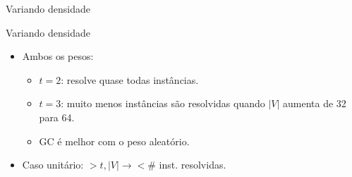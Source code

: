 \documentclass[dvipsnames]{beamer}
\begin{document}
\begin{frame}{Variando densidade}
\begin{figure}%
    \centering
    \label{fig:time_inst_den-sf2_sf3-euclidean}%
\end{figure}
\end{frame}

\begin{frame}{Variando densidade}
\begin{itemize}
\item Ambos os pesos:
  \begin{itemize}
  \item $t = 2$: resolve quase todas instâncias.
  \item $t = 3$: muito menos instâncias são resolvidas quando $|V|$ aumenta de 32 para 64.
  \item GC é melhor com o peso aleatório.
  \end{itemize}
  \item Caso unitário: $> t, |V| \rightarrow < \#$ inst. resolvidas.
\end{itemize}  
  \end{frame}
\end{document}
